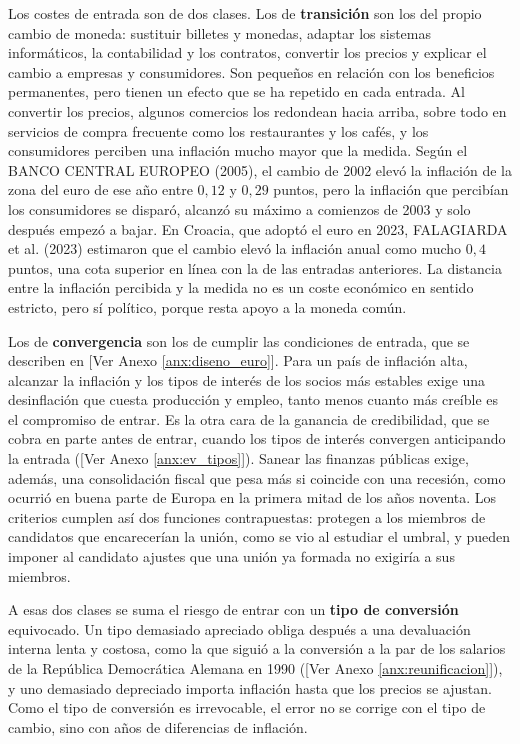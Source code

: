 \documentclass[10pt,a4paper]{article}
\newcommand{\authorfont}[1]{{\fontfamily{EBGaramond-TLF}\selectfont #1}}
\begin{document}
Los costes de entrada son de dos clases. Los de \textbf{transición} son los del propio cambio de moneda: sustituir billetes y monedas, adaptar los sistemas informáticos, la contabilidad y los contratos, convertir los precios y explicar el cambio a empresas y consumidores. Son pequeños en relación con los beneficios permanentes, pero tienen un efecto que se ha repetido en cada entrada. Al convertir los precios, algunos comercios los redondean hacia arriba, sobre todo en servicios de compra frecuente como los restaurantes y los cafés, y los consumidores perciben una inflación mucho mayor que la medida. Según el BANCO CENTRAL EUROPEO (2005), el cambio de 2002 elevó la inflación de la zona del euro de ese año entre $0{,}12$ y $0{,}29$ puntos, pero la inflación que percibían los consumidores se disparó, alcanzó su máximo a comienzos de 2003 y solo después empezó a bajar. En Croacia, que adoptó el euro en 2023, FALAGIARDA et al. (2023) estimaron que el cambio elevó la inflación anual como mucho $0{,}4$ puntos, una cota superior en línea con la de las entradas anteriores. La distancia entre la inflación percibida y la medida no es un coste económico en sentido estricto, pero sí político, porque resta apoyo a la moneda común.

Los de \textbf{convergencia} son los de cumplir las condiciones de entrada, que se describen en [\authorfont{Ver Anexo \ref{anx:diseno_euro}}]. Para un país de inflación alta, alcanzar la inflación y los tipos de interés de los socios más estables exige una desinflación que cuesta producción y empleo, tanto menos cuanto más creíble es el compromiso de entrar. Es la otra cara de la ganancia de credibilidad, que se cobra en parte antes de entrar, cuando los tipos de interés convergen anticipando la entrada ([\authorfont{Ver Anexo \ref{anx:ev_tipos}}]). Sanear las finanzas públicas exige, además, una consolidación fiscal que pesa más si coincide con una recesión, como ocurrió en buena parte de Europa en la primera mitad de los años noventa. Los criterios cumplen así dos funciones contrapuestas: protegen a los miembros de candidatos que encarecerían la unión, como se vio al estudiar el umbral, y pueden imponer al candidato ajustes que una unión ya formada no exigiría a sus miembros.

A esas dos clases se suma el riesgo de entrar con un \textbf{tipo de conversión} equivocado. Un tipo demasiado apreciado obliga después a una devaluación interna lenta y costosa, como la que siguió a la conversión a la par de los salarios de la República Democrática Alemana en 1990 ([\authorfont{Ver Anexo \ref{anx:reunificacion}}]), y uno demasiado depreciado importa inflación hasta que los precios se ajustan. Como el tipo de conversión es irrevocable, el error no se corrige con el tipo de cambio, sino con años de diferencias de inflación.
\end{document}
